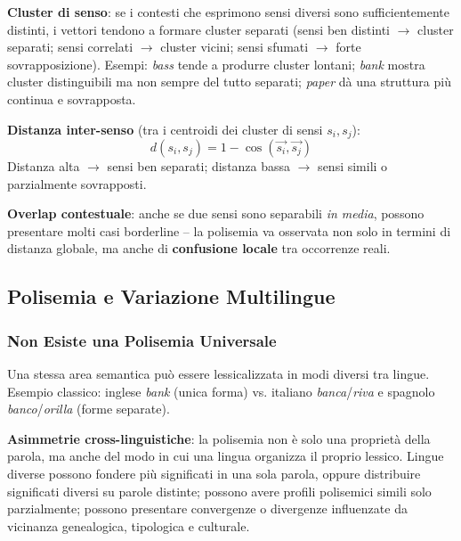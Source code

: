 \documentclass[12pt,a4paper]{article}
\begin{document}
\begin{defbox}
\textbf{Cluster di senso}: se i contesti che esprimono sensi diversi sono sufficientemente distinti, i vettori tendono a formare cluster separati (sensi ben distinti $\to$ cluster separati; sensi correlati $\to$ cluster vicini; sensi sfumati $\to$ forte sovrapposizione). Esempi: \textit{bass} tende a produrre cluster lontani; \textit{bank} mostra cluster distinguibili ma non sempre del tutto separati; \textit{paper} d\`a una struttura pi\`u continua e sovrapposta.
\end{defbox}

\begin{formulabox}
\textbf{Distanza inter-senso} (tra i centroidi dei cluster di sensi $s_i, s_j$):
\[
d(s_i, s_j) = 1 - \cos(\vec{s_i}, \vec{s_j})
\]
Distanza alta $\to$ sensi ben separati; distanza bassa $\to$ sensi simili o parzialmente sovrapposti.
\end{formulabox}

\textbf{Overlap contestuale}: anche se due sensi sono separabili \emph{in media}, possono presentare molti casi borderline -- la polisemia va osservata non solo in termini di distanza globale, ma anche di \textbf{confusione locale} tra occorrenze reali.

\subsection{Polisemia e Variazione Multilingue}

\subsubsection{Non Esiste una Polisemia Universale}

Una stessa area semantica pu\`o essere lessicalizzata in modi diversi tra lingue. Esempio classico: inglese \textit{bank} (unica forma) vs. italiano \textit{banca}/\textit{riva} e spagnolo \textit{banco}/\textit{orilla} (forme separate).

\begin{quizbox}
\textbf{Asimmetrie cross-linguistiche}: la polisemia non \`e solo una propriet\`a della parola, ma anche del modo in cui una lingua organizza il proprio lessico. Lingue diverse possono fondere pi\`u significati in una sola parola, oppure distribuire significati diversi su parole distinte; possono avere profili polisemici simili solo parzialmente; possono presentare convergenze o divergenze influenzate da vicinanza genealogica, tipologica e culturale.
\end{quizbox}
\end{document}
